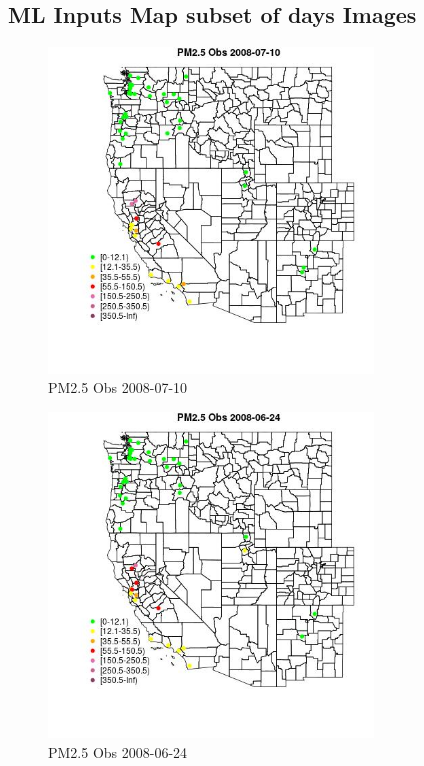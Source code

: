 
\subsection{ML Inputs Map subset of days Images} 
 

\begin{figure} 
\centering  
\includegraphics[width=0.77\textwidth]{Code_Outputs/Report_ML_input_PM25_Step4_part_e_de_duplicated_aves_MapObsPM25_Obs2008-07-10.jpg} 
\caption{\label{fig:Report_ML_input_PM25_Step4_part_e_de_duplicated_avesMapObsPM25_Obs2008-07-10}PM2.5 Obs 2008-07-10} 
\end{figure} 
 

\begin{figure} 
\centering  
\includegraphics[width=0.77\textwidth]{Code_Outputs/Report_ML_input_PM25_Step4_part_e_de_duplicated_aves_MapObsPM25_Obs2008-06-24.jpg} 
\caption{\label{fig:Report_ML_input_PM25_Step4_part_e_de_duplicated_avesMapObsPM25_Obs2008-06-24}PM2.5 Obs 2008-06-24} 
\end{figure} 
 

